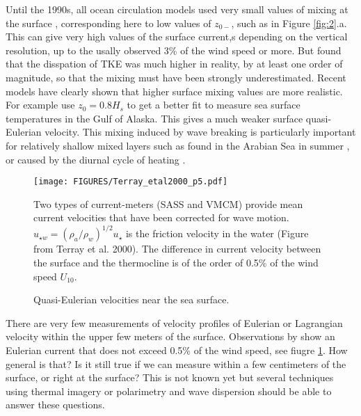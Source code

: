 Until the 1990s, all ocean circulation models used very small values of mixing at the surface \citep[e.g.][]{Large&al.1994}, corresponding 
here to low values of $z_{0-}$, such as in Figure \ref{fig:2}.a. This can give very high values of the surface current,s depending on the vertical resolution, 
up to the usally observed 3\% of the wind speed 
\citep{Huang1979} or more. But \cite{Agrawal&al.1992} found that the disspation of TKE was much higher in reality, by at least 
one order of magnitude, so that the mixing must have been strongly underestimated.  Recent models have clearly shown that 
higher surface mixing values are more realistic. For example \cite{Mellor&Blumberg2004} use  $z_0=0.8 H_s$ to get a better fit to measure sea surface temperatures 
in the Gulf of Alaska. This gives a much weaker surface quasi-Eulerian velocity.  This mixing induced by wave breaking is particularly important for 
relatively shallow mixed layers such as found in the Arabian Sea in summer \citep{Janssen2012}, or caused by the diurnal cycle of heating \citep{Noh1996,Noh&Kim1999}.

\begin{figure}
\centerline{\texttt{[image: FIGURES/Terray\_etal2000\_p5.pdf]}}
  \caption{Quasi-Eulerian velocities near the sea surface.}{Two types of current-meters  (SASS and VMCM) provide mean current velocities that have been corrected for wave motion. $u_{\star w}=(\rho_a/\rho_w)^{1/2} u_{\star}$ is the friction velocity in the water (Figure from Terray et al. 2000)\nocite{Terray&al.2000}. The difference in current velocity between the surface and the thermocline is of the order of  0.5\% 
  of the wind speed $U_{10}$.} \label{fig_Santala}
\end{figure}
There are very few measurements of velocity profiles of Eulerian or Lagrangian velocity within the upper 
few meters of the surface. Observations by \cite{Santala&Terray1992} show an Eulerian current that does not exceed  0.5\% of the wind 
speed, see fiugre
\ref{fig_Santala}. 
How general is that? Is it still true if we can measure within a few centimeters of the surface, or right at the surface? 
This is not known yet but several techniques using thermal imagery or polarimetry and wave dispersion should be able to answer these questions. 


